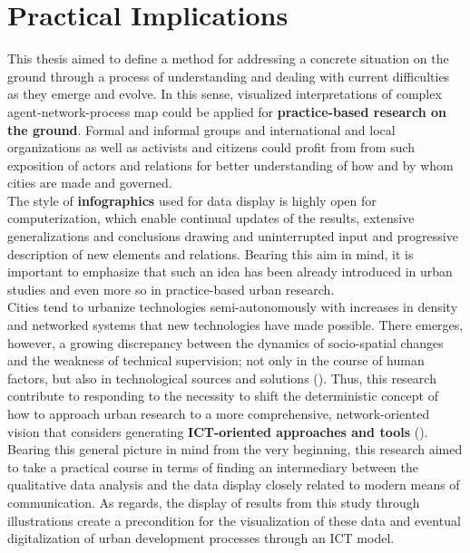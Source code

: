 \documentclass[11pt]{report}
\begin{document}
{{{\section{Practical Implications}

This thesis aimed to define a method for addressing a concrete situation on the ground through a process of understanding and dealing with current difficulties as they emerge and evolve.
In this sense, visualized interpretations of complex agent-network-process map could be applied for \textbf{practice-based research on the ground}.
Formal and informal groups and international and local organizations as well as activists and citizens could profit from from such exposition of actors and relations for better understanding of how and by whom cities are made and governed.
\\

The style of \textbf{infographics} used for data display is highly open for computerization, which enable continual updates of the results, extensive generalizations and conclusions drawing and uninterrupted input and progressive description of new elements and relations.
Bearing this aim in mind, it is important to emphasize that such an idea has been already introduced in urban studies and even more so in practice-based urban research.
\\

Cities tend to urbanize technologies semi-autonomously with increases in density and networked systems that new technologies have made possible.
There emerges, however, a growing discrepancy between the dynamics of socio-spatial changes and the weakness of technical supervision; not only in the course of human factors, but also in technological sources and solutions (\href{Vauquelin}{\citealt{vauquelin_planification_2010}}).
Thus, this research contribute to responding to the necessity to shift the deterministic concept of how to approach urban research to a more comprehensive, network-oriented vision that considers generating \textbf{ICT-oriented approaches and tools} (\href{Huang}{\citealt{huang_ict-oriented_2012}}).
\\

Bearing this general picture in mind from the very beginning, this research aimed to take a practical course in terms of finding an intermediary between the qualitative data analysis and the data display closely related to modern means of communication.
As regards, the display of results from this study through illustrations create a precondition for the visualization of these data and eventual digitalization of urban development processes through an ICT model.

}}}
\end{document}
